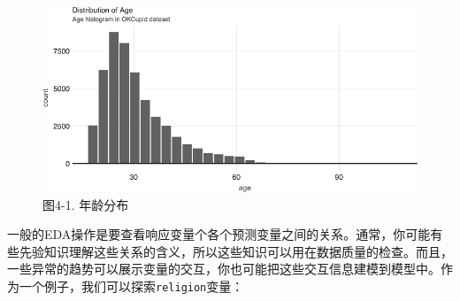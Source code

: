 \documentclass[
]{article}
\begin{document}
\begin{figure}
\centering
\includegraphics{figures/4_1.png}
\caption{图4-1. 年龄分布}
\end{figure}

一般的EDA操作是要查看响应变量个各个预测变量之间的关系。通常，你可能有些先验知识理解这些关系的含义，所以这些知识可以用在数据质量的检查。而且，一些异常的趋势可以展示变量的交互，你也可能把这些交互信息建模到模型中。作为一个例子，我们可以探索\texttt{religion}变量：
\end{document}
